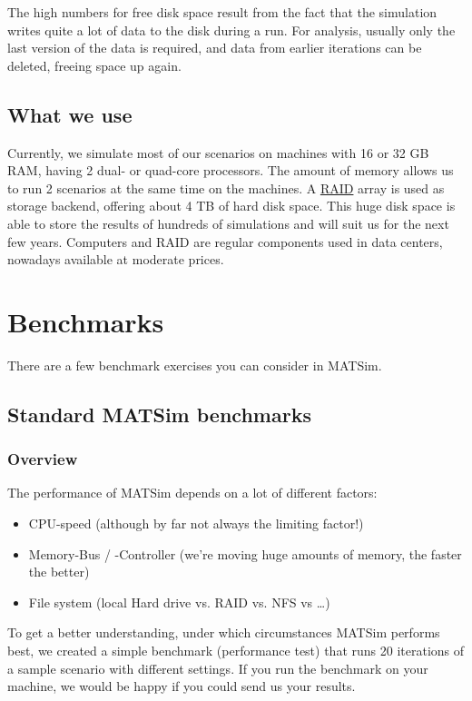 The  high numbers for free disk space result from the fact that the  simulation writes quite a lot of data to the disk during a run. For  analysis, usually only the last version of the data is required, and  data from earlier iterations can be deleted, freeing space up again.

\subsection{What we use}

Currently,  we simulate most of our scenarios on machines with 16 or 32 GB RAM,  having 2 dual- or quad-core processors. The amount of memory allows us to run 2  scenarios at the same time on the machines. A \href{http://en.wikipedia.org/wiki/RAID}{RAID}  array is used as storage backend, offering about 4 TB of hard disk  space. This huge disk space is able to store the results of hundreds of  simulations and will suit us for the next few years. Computers and RAID  are regular components used in data centers, nowadays available at moderate prices.

\section{Benchmarks}

There are a few benchmark exercises you can consider in MATSim.

\subsection{Standard MATSim benchmarks}
\subsubsection{Overview}
The performance of MATSim depends on a lot of different factors:
\begin{itemize}
\item CPU-speed (although by far not always the limiting factor!)
\item Memory-Bus / -Controller (we're moving huge amounts of memory, the faster the better)
\item File system (local Hard drive vs. RAID vs. NFS vs \ldots)
\end{itemize}
To get a better understanding, under which circumstances MATSim performs best, we created a simple benchmark (performance test) that runs 20 iterations of a sample scenario with different settings. If you run the benchmark on your machine, we would be happy if you could send us your results.

